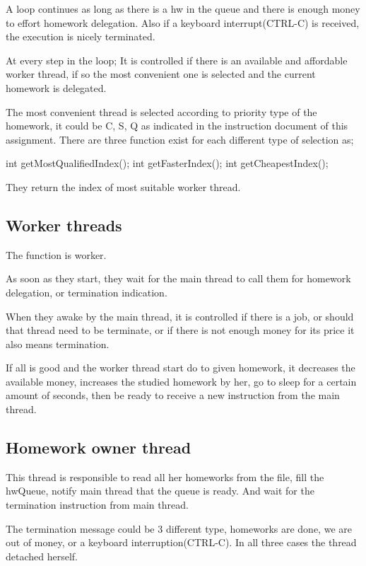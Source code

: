 \documentclass{article}
\begin{document}
    A loop continues as long as there is a hw in the queue and there is enough money to effort homework delegation. Also if a keyboard interrupt(CTRL-C) is received, the execution is nicely terminated.
    
    At every step in the loop;
        It is controlled if there is an available and affordable worker thread, if so the most convenient one is selected and the current homework is delegated. 

    The most convenient thread is selected according to priority type of the homework, it could be
    C, S, Q as indicated in the instruction document of this assignment. There are three function exist for each different type of selection as;
    
    int getMostQualifiedIndex();
    int getFasterIndex();
    int getCheapestIndex();
    
    They return the index of most suitable worker thread.

\subsection*{Worker threads}
    The function is worker.
    
    As soon as they start, they wait for the main thread to call them for homework delegation, or termination indication.
    
    When they awake by the main thread, it is controlled if there is a job, or should that thread need to be terminate, or if there is not enough money for its price it also means termination.
    
    If all is good and the worker thread start do to given homework, it decreases the available money, increases the studied homework by her, go to sleep for a certain amount of seconds, then be ready to receive a new instruction from the main thread.
    
    
\subsection*{Homework owner thread }
    This thread is responsible to read all her homeworks from the file, fill the hwQueue, notify main thread that the queue is ready. And wait for the termination instruction from main thread. 
    
    The termination message could be 3 different type, homeworks are done, we are out of money, or a keyboard interruption(CTRL-C). In all three cases the thread detached herself.
    
\end{document}
